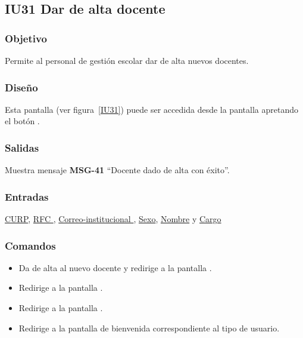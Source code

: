 
\subsection{IU31 Dar de alta docente}
\subsubsection{Objetivo}
    Permite al personal de gestión escolar dar de alta nuevos docentes.
\subsubsection{Diseño}
    Esta pantalla  (ver figura~\ref{IU31}) puede ser accedida desde la pantalla  apretando el botón .

\subsubsection{Salidas}
Muestra mensaje {\bf MSG-41} ``Docente dado de alta con éxito''.
\subsubsection{Entradas}
\hyperlink{Docente.CURP }{CURP}, \hyperlink{Docente.RFC }{RFC }, \hyperlink{Docente.Correo-institucional}{ Correo-institucional }, \hyperlink{Docente.Sexo}{Sexo}, \hyperlink{ Docente.Nombre}{Nombre} y \hyperlink{Docente.Cargo}{Cargo}
\subsubsection{Comandos}
\begin{itemize}
    \item {} Da de alta al nuevo docente y redirige a la pantalla .
    \item {} Redirige a la pantalla .
    \item {} Redirige a la pantalla .
    \item {} Redirige a la pantalla de bienvenida correspondiente al tipo de usuario.
    
\end{itemize}

